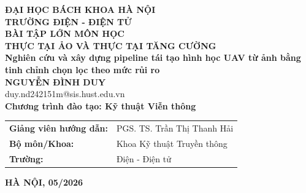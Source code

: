 \documentclass[DoAn.tex]{subfiles}
\begin{document}
\begin{titlepage}
\thispagestyle{empty}
\begin{center}

{\textbf{\large ĐẠI HỌC BÁCH KHOA HÀ NỘI}}\\[0.35cm]
{\textbf{\large TRƯỜNG ĐIỆN - ĐIỆN TỬ}}\\[3.8cm]

{\textbf{\huge BÀI TẬP LỚN MÔN HỌC}}\\[0.35cm]
{\textbf{\Large THỰC TẠI ẢO VÀ THỰC TẠI TĂNG CƯỜNG}}\\[1.0cm]
{\textbf{\Large Nghiên cứu và xây dựng pipeline tái tạo hình học UAV từ ảnh bằng tinh chỉnh chọn lọc theo mức rủi ro}}\\[1.5cm]

{\textbf{\large NGUYỄN ĐÌNH DUY}}\\
{\large duy.nd242151m@sis.hust.edu.vn}\\[0.6cm]
{\textbf{\large Chương trình đào tạo: Kỹ thuật Viễn thông}}\\[3.8cm]

\begin{table}[H]
\centering
\renewcommand{\arraystretch}{1.4}
\begin{tabular}{ll}
\textbf{Giảng viên hướng dẫn:} & PGS. TS. Trần Thị Thanh Hải \\
\textbf{Bộ môn/Khoa:} & Khoa Kỹ thuật Truyền thông \\
\textbf{Trường:} & Điện - Điện tử \\
\end{tabular}
\end{table}

\vfill
{\textbf{HÀ NỘI, 05/2026}}
\end{center}
\end{titlepage}
\end{document}
